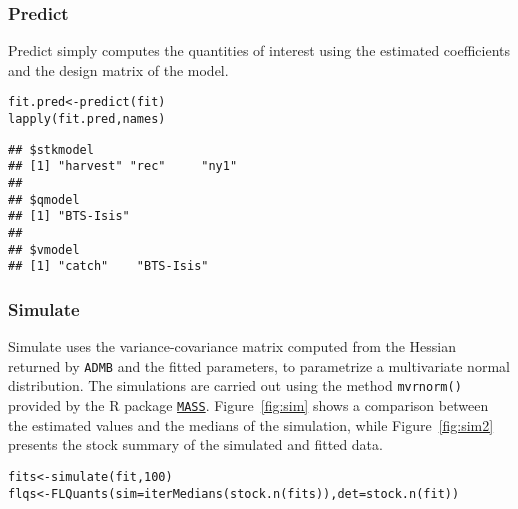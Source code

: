 \documentclass[a4paper,english,10pt]{article}\usepackage[]{graphicx}\usepackage[]{color}
\makeatletter
\newcommand{\hlnum}[1]{\textcolor[rgb]{0.2,0.2,0.2}{#1}}%
\newcommand{\hlstd}[1]{\textcolor[rgb]{0,0,0}{#1}}%
\newcommand{\hlkwb}[1]{\textcolor[rgb]{0.361,0.506,0.596}{#1}}%
\newcommand{\hlkwc}[1]{\textcolor[rgb]{0.361,0.506,0.596}{#1}}%
\newcommand{\hlkwd}[1]{\textcolor[rgb]{0.361,0.506,0.596}{#1}}%
\newenvironment{kframe}{%
 \def\at@end@of@kframe{}%
 \ifinner\ifhmode%
  \def\at@end@of@kframe{\end{minipage}}%
  \begin{minipage}{\columnwidth}%
 \fi\fi%
 \def\FrameCommand##1{\hskip\@totalleftmargin \hskip-\fboxsep
 \colorbox{shadecolor}{##1}\hskip-\fboxsep
     \hskip-\linewidth \hskip-\@totalleftmargin \hskip\columnwidth}%
 \MakeFramed {\advance\hsize-\width
   \@totalleftmargin\z@ \linewidth\hsize
   \@setminipage}}%
 {\par\unskip\endMakeFramed%
 \at@end@of@kframe}
\newenvironment{knitrout}{}{} %
\newcommand{\code}[1]{{\texttt{#1}}}
\newcommand{\pkg}[1]{{\texttt{#1}}}
\makeatother
\begin{document}
\subsubsection{Predict}

Predict simply computes the quantities of interest using the estimated coefficients and the design matrix of the model.

\begin{knitrout}
\color{fgcolor}\begin{kframe}
\begin{alltt}
\hlstd{fit.pred} \hlkwb{<-} \hlkwd{predict}\hlstd{(fit)}
\hlkwd{lapply}\hlstd{(fit.pred, names)}
\end{alltt}
\begin{verbatim}
## $stkmodel
## [1] "harvest" "rec"     "ny1"    
## 
## $qmodel
## [1] "BTS-Isis"
## 
## $vmodel
## [1] "catch"    "BTS-Isis"
\end{verbatim}
\end{kframe}
\end{knitrout}

\subsubsection{Simulate}

Simulate uses the variance-covariance matrix computed from the Hessian returned by \pkg{ADMB} and the fitted parameters, to parametrize a multivariate normal distribution. The simulations are carried out using the method \code{mvrnorm()} provided by the R package \href{http://cran.r-project.org/web/packages/MASS/}{\pkg{MASS}}. Figure~\ref{fig:sim} shows a comparison between the estimated values and the medians of the simulation, while Figure~\ref{fig:sim2} presents the stock summary of the simulated and fitted data.

\begin{knitrout}
\color{fgcolor}\begin{kframe}
\begin{alltt}
\hlstd{fits} \hlkwb{<-} \hlkwd{simulate}\hlstd{(fit,} \hlnum{100}\hlstd{)}
\hlstd{flqs} \hlkwb{<-} \hlkwd{FLQuants}\hlstd{(}\hlkwc{sim}\hlstd{=}\hlkwd{iterMedians}\hlstd{(}\hlkwd{stock.n}\hlstd{(fits)),} \hlkwc{det}\hlstd{=}\hlkwd{stock.n}\hlstd{(fit))}
\end{alltt}
\end{kframe}
\end{knitrout}
\end{document}
